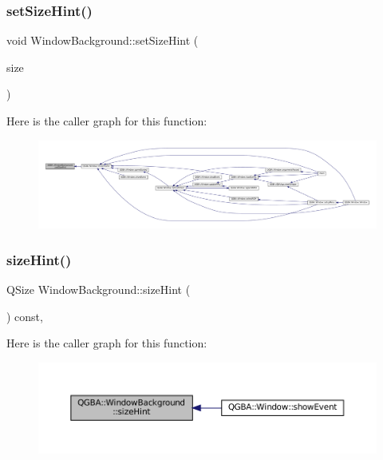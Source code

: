 \subsubsection{\texorpdfstring{set\+Size\+Hint()}{setSizeHint()}}
{\footnotesize\ttfamily void Window\+Background\+::set\+Size\+Hint (\begin{DoxyParamCaption}\item[{const Q\+Size \&}]{size }\end{DoxyParamCaption})}

Here is the caller graph for this function\+:
\nopagebreak
\begin{figure}[H]
\begin{center}
\leavevmode
\includegraphics[width=350pt]{class_q_g_b_a_1_1_window_background_a037a6e2b520926ee2bb6aa4ce864aa11_icgraph}
\end{center}
\end{figure}
\mbox{\label{class_q_g_b_a_1_1_window_background_a4dff2bccdcecd03b492d0dbf1e53b01b}} 
\subsubsection{\texorpdfstring{size\+Hint()}{sizeHint()}}
{\footnotesize\ttfamily Q\+Size Window\+Background\+::size\+Hint (\begin{DoxyParamCaption}{ }\end{DoxyParamCaption}) const\hspace{0.3cm}{\ttfamily [override]}, {\ttfamily [virtual]}}

Here is the caller graph for this function\+:
\nopagebreak
\begin{figure}[H]
\begin{center}
\leavevmode
\includegraphics[width=350pt]{class_q_g_b_a_1_1_window_background_a4dff2bccdcecd03b492d0dbf1e53b01b_icgraph}
\end{center}
\end{figure}



